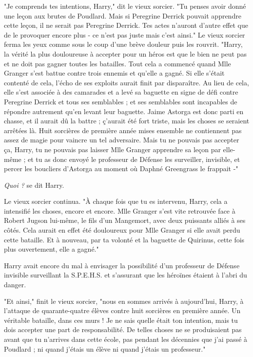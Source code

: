 "Je comprends tes intentions, Harry," dit le vieux sorcier. "Tu penses avoir donné une leçon aux brutes de Poudlard. Mais si Peregrine Derrick pouvait apprendre cette leçon, il ne serait pas Peregrine Derrick. Tes actes n'auront d'autre effet que de le provoquer encore plus - ce n'est pas juste mais c'est ainsi." Le vieux sorcier ferma les yeux comme sous le coup d'une brève douleur puis les rouvrit. "Harry, la vérité la plus douloureuse à accepter pour un héros est que le bien ne peut pas et ne doit pas gagner toutes les batailles. Tout cela a commencé quand Mlle Granger s'est battue contre trois ennemis et qu'elle a gagné. Si elle s'était contenté de cela, l'écho de ses exploits aurait finit par disparaître. Au lieu de cela, elle s'est associée à des camarades et a levé sa baguette en signe de défi contre Peregrine Derrick et tous ses semblables ; et ses semblables sont incapables de répondre autrement qu'en levant leur baguette. Jaime Astorga est donc parti en chasse, et il aurait dû la battre ; ç'aurait été fort triste, mais les choses se seraient arrêtées là. Huit sorcières de première année mises ensemble ne contiennent pas assez de magie pour vaincre un tel adversaire. Mais tu ne pouvais pas accepter ça, Harry, tu ne pouvais pas laisser Mlle Granger apprendre sa leçon par elle-même ; et tu as donc envoyé le professeur de Défense les surveiller, invisible, et percer les boucliers d'Astorga au moment où Daphné Greengrass le frappait -"

\emph{Quoi ?}  se dit Harry.

Le vieux sorcier continua. "À chaque fois que tu es intervenu, Harry, cela a intensifié les choses, encore et encore. Mlle Granger s'est vite retrouvée face à Robert Jugson lui-même, le fils d'un Mangemort, avec deux puissants alliés à ses côtés. Cela aurait en effet été douloureux pour Mlle Granger si elle avait perdu cette bataille. Et à nouveau, par ta volonté et la baguette de Quirinus, cette fois plus ouvertement, elle a gagné."

Harry avait encore du mal à envisager la possibilité d'un professeur de Défense invisible surveillant la S.P.E.H.S. et s'assurant que les héroïnes étaient à l'abri du danger.

"Et ainsi," finit le vieux sorcier, "nous en sommes arrivés à aujourd'hui, Harry, à l'attaque de quarante-quatre élèves contre huit sorcières en première année. Un véritable bataille, dans ces murs ! Je ne sais quelle était ton intention, mais tu dois accepter une part de responsabilité. De telles choses ne se produisaient pas avant que tu n'arrives dans cette école, pas pendant les décennies que j'ai passé à Poudlard ; ni quand j'étais un élève ni quand j'étais un professeur."

